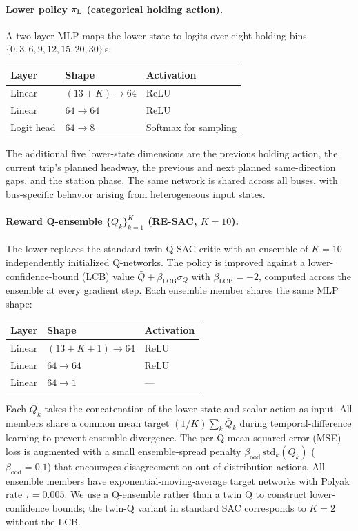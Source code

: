 \paragraph{Lower policy $\pi_{\mathrm{L}}$ (categorical holding action).}
A two-layer MLP maps the lower state to logits over eight holding bins $\{0,3,6,9,12,15,20,30\}$\,s:
\begin{center}
\small
\begin{tabular}{lll}
\toprule
Layer & Shape & Activation \\
\midrule
Linear & $(13{+}K) \to 64$ & ReLU \\
Linear & $64 \to 64$ & ReLU \\
Logit head & $64 \to 8$ & Softmax for sampling \\
\bottomrule
\end{tabular}
\end{center}
The additional five lower-state dimensions are the previous holding action, the current trip's planned headway, the previous and next planned same-direction gaps, and the station phase. The same network is shared across all buses, with bus-specific behavior arising from heterogeneous input states.

\paragraph{Reward Q-ensemble $\{Q_k\}_{k=1}^{K}$ (RE-SAC, $K{=}10$).}
The lower replaces the standard twin-Q SAC critic with an ensemble of $K{=}10$ independently initialized Q-networks. The policy is improved against a lower-confidence-bound (LCB) value $\bar{Q} + \beta_{\mathrm{LCB}} \sigma_Q$ with $\beta_{\mathrm{LCB}} = -2$, computed across the ensemble at every gradient step. Each ensemble member shares the same MLP shape:
\begin{center}
\small
\begin{tabular}{lll}
\toprule
Layer & Shape & Activation \\
\midrule
Linear & $(13{+}K{+}1) \to 64$ & ReLU \\
Linear & $64 \to 64$ & ReLU \\
Linear & $64 \to 1$ & --- \\
\bottomrule
\end{tabular}
\end{center}
Each $Q_k$ takes the concatenation of the lower state and scalar action as input. All members share a common mean target $(1/K)\sum_k \bar{Q}_k$ during temporal-difference learning to prevent ensemble divergence. The per-Q mean-squared-error (MSE) loss is augmented with a small ensemble-spread penalty $\beta_{\mathrm{ood}}\,\mathrm{std}_k(Q_k)$ ($\beta_{\mathrm{ood}}{=}0.1$) that encourages disagreement on out-of-distribution actions. All ensemble members have exponential-moving-average target networks with Polyak rate $\tau = 0.005$. We use a Q-ensemble rather than a twin Q to construct lower-confidence bounds; the twin-Q variant in standard SAC corresponds to $K{=}2$ without the LCB.

